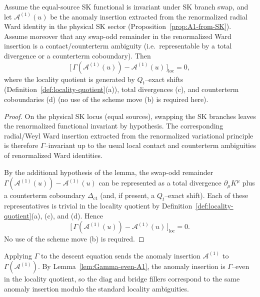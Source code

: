 \begin{lemma}
\label{lem:Gamma-even-A1}
Assume the equal-source SK functional is invariant under SK branch swap, and let
$\mathcal A^{(1)}(u)$ be the anomaly insertion extracted from the renormalized radial Ward identity
in the physical SK sector (Proposition~\ref{prop:A1-from-SK}).
Assume moreover that any swap-odd remainder in the renormalized Ward insertion is a
contact/counterterm ambiguity (i.e.\ representable by a total divergence or a counterterm
coboundary). Then
\[
\big[\,\Gamma(\mathcal A^{(1)}(u))-\mathcal A^{(1)}(u)\,\big]_{\mathrm{loc}}=0,
\]
where the locality quotient is generated by $Q_t$--exact shifts
(Definition~\ref{def:locality-quotient}\textnormal{(a)}), total divergences
\textnormal{(c)}, and counterterm coboundaries \textnormal{(d)} (no use of the scheme move
\textnormal{(b)} is required here).
\end{lemma}

\begin{proof}
On the physical SK locus (equal sources), swapping the SK branches leaves the
renormalized functional invariant by hypothesis.  The corresponding radial/Weyl
Ward insertion extracted from the renormalized variational principle is
therefore $\Gamma$--invariant up to the usual local contact and counterterm
ambiguities of renormalized Ward identities.

By the additional hypothesis of the lemma, the swap-odd remainder
$\Gamma(\mathcal A^{(1)}(u))-\mathcal A^{(1)}(u)$ can be represented as a total
divergence $\partial_\mu K^\mu$ plus a counterterm coboundary $\Delta_{\mathrm{ct}}$
(and, if present, a $Q_t$--exact shift).  Each of these representatives is
trivial in the locality quotient by
Definition~\ref{def:locality-quotient}\textnormal{(a)}, \textnormal{(c)}, and
\textnormal{(d)}.  Hence
\[
\big[\,\Gamma(\mathcal A^{(1)}(u))-\mathcal A^{(1)}(u)\,\big]_{\mathrm{loc}}=0.
\]
No use of the scheme move \textnormal{(b)} is required.
\end{proof}

\begin{remark}
\label{rem:anomaly-parity}
Applying $\Gamma$ to the descent equation sends the anomaly insertion
$\mathcal A^{(1)}$ to $\Gamma(\mathcal A^{(1)})$. By
Lemma~\ref{lem:Gamma-even-A1}, the anomaly insertion is $\Gamma$--even in the
locality quotient, so the $\mathrm{diag}$ and $\mathrm{bridge}$ fillers correspond
to the same anomaly insertion modulo the standard locality ambiguities.
\end{remark}

